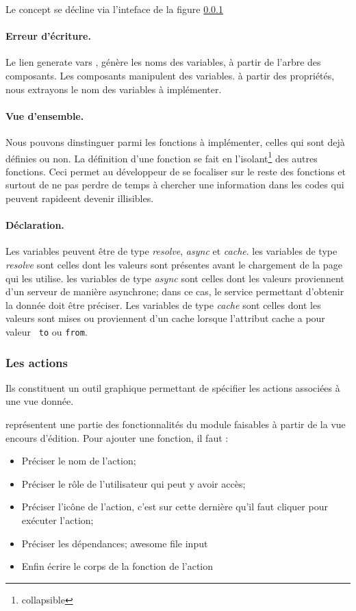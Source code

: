 \documentclass[a4paper,11pt]{report}
\begin{document}
Le concept se décline via l'inteface de la figure \ref{}

\paragraph{Erreur d'écriture.}
Le lien \og generate vars \fg, génère les noms des variables, à partir
de l'arbre des composants. Les composants manipulent des variables. à
partir des propriétés, nous extrayons
le nom des variables à implémenter.

\paragraph{Vue d'ensemble.}
Nous pouvons dinstinguer parmi les fonctions à implémenter, celles qui
sont dejà définies ou non. La définition d'une fonction se fait en
l'isolant\footnote{collapsible} des autres fonctions. Ceci permet au
développeur de se focaliser sur le reste des fonctions et surtout de
ne pas perdre de temps à chercher une information dans les codes qui
peuvent rapideent devenir illisibles.

\paragraph{Déclaration.}
Les variables peuvent être de type {\em resolve}, {\em async} et {\em
  cache}.  les variables de type {\em resolve} sont celles dont les
valeurs sont présentes avant le chargement de la page qui les utilise.
les variables de type {\em async} sont celles dont les valeurs
proviennent d'un serveur de manière asynchrone; dans ce cas, le
service permettant d'obtenir la donnée doit être préciser.  Les
variables de type {\em cache} sont celles dont les valeurs sont mises
ou proviennent d'un cache lorsque l'attribut cache a pour valeur {\tt
  to} ou  {\tt from}.


\subsubsection{ Les actions}

Ils constituent un outil graphique permettant de spécifier les actions
associées à une vue donnée.

représentent une partie des fonctionnalités
du module faisables à partir de la vue encours d'édition.  Pour
ajouter une fonction, il faut :
\begin{itemize}
\item Préciser le nom de l'action;
\item  Préciser le rôle de l'utilisateur qui peut y avoir accès;
\item Préciser l'icône  de l'action, c'est sur cette dernière qu'il faut cliquer pour exécuter l'action;
\item Préciser les dépendances;
awesome file input\item Enfin écrire le corps de la fonction de l'action
\end{itemize}
\end{document}
